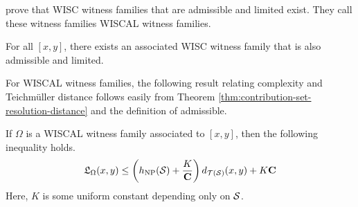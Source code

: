 \textcite{dowdall2023lattice} prove that WISC witness families that are admissible and limited exist. They call these witness families WISCAL witness families.

\begin{proposition}
  For all $[x,y]$, there exists an associated WISC witness family that is also admissible and limited.
\end{proposition}

For WISCAL witness families, the following result relating complexity and Teichmüller distance follows easily from Theorem \ref{thm:contribution-set-resolution-distance} and the definition of admissible.

\begin{proposition}
  \label{prop:complexity-length-inequality}
  If $\Omega$ is a WISCAL witness family associated to $[x,y]$, then the following inequality holds.
  \begin{align*}
    \mathfrak{L}_{\Omega}(x,y) \leq \left( h_{\mathrm{NP}}(\mathcal{S}) + \frac{K}{\mathbf{C}} \right) d_{\mathcal{T}(\mathcal{S})}(x, y) + K \mathbf{C}
  \end{align*}
  Here, $K$ is some uniform constant depending only on $\mathcal{S}$.
\end{proposition}




